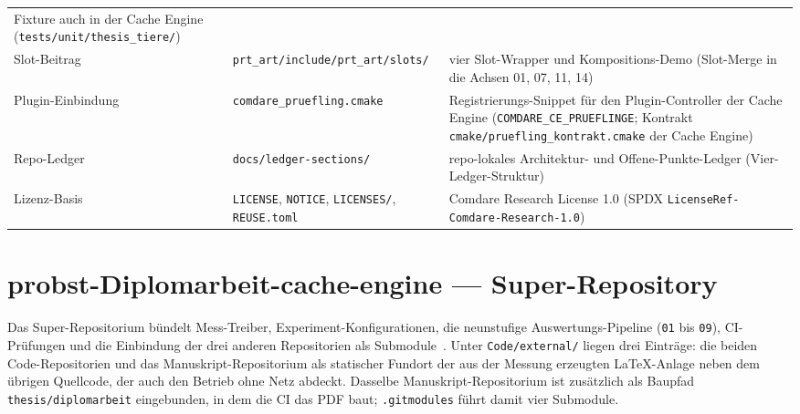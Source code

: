 {\begin{longtable}{@{}>{\raggedright\arraybackslash}p{}>{\raggedright\arraybackslash}p{}>{\raggedright\arraybackslash}p{}@{}}
Fixture auch in der Cache Engine (\texttt{tests/\allowbreak{}unit/\allowbreak{}thesis\_tiere/}) \\
Slot-Beitrag &
\texttt{prt\_art/\allowbreak{}include/\allowbreak{}prt\_art/\allowbreak{}slots/} &
vier Slot-Wrapper und Kompositions-Demo (Slot-Merge in die Achsen 01, 07, 11, 14) \\
Plugin-Einbindung &
\texttt{comdare\_pruefling.cmake} &
Registrierungs-Snippet für den Plugin-Controller der Cache Engine
(\texttt{COMDARE\_\allowbreak{}CE\_\allowbreak{}PRUEFLINGE}; Kontrakt
\texttt{cmake/\allowbreak{}pruefling\_\allowbreak{}kontrakt.cmake} der Cache Engine) \\
Repo-Ledger &
\texttt{docs/\allowbreak{}ledger-sections/} &
repo-lokales Architektur- und Offene-Punkte-Ledger (Vier-Ledger-Struktur) \\
Lizenz-Basis &
\texttt{LICENSE}, \texttt{NOTICE}, \texttt{LICENSES/}, \texttt{REUSE.toml} &
Comdare Research License 1.0 (SPDX \texttt{LicenseRef-\allowbreak{}Comdare-\allowbreak{}Research-1.0}) \\
\end{longtable}
}

\section*{probst-Diplomarbeit-cache-engine --- Super-Repository}

Das Super-Repositorium bündelt Mess-Treiber, Experiment-Konfigurationen, die neunstufige
Auswertungs-Pipeline (\texttt{01} bis \texttt{09}), CI-Prüfungen und die Einbindung der drei anderen
Repositorien als Submodule~\cite{git2026gitmodules}. Unter \texttt{Code/\allowbreak{}external/} liegen drei
Einträge: die beiden Code-Repositorien und das Manuskript-Repositorium als statischer Fundort der aus der
Messung erzeugten LaTeX-Anlage neben dem übrigen Quellcode, der auch den Betrieb ohne Netz abdeckt.
Dasselbe Manuskript-Repositorium ist zusätzlich als Baupfad \texttt{thesis/\allowbreak{}diplomarbeit}
eingebunden, in dem die CI das PDF baut; \texttt{.gitmodules} führt damit vier Submodule.

